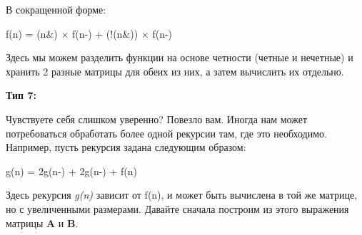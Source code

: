 \vspace{\baselineskip}
В сокращенной форме:

 \vspace{\baselineskip}
\begin{tcolorbox}
   f(n) = (n\&) $\times$ f(n-) + (!(n\&)) $\times$ f(n-)
\end{tcolorbox}

\vspace{\baselineskip}
Здесь мы можем разделить функции на основе четности (четные и нечетные) и хранить 2 разные матрицы для обеих из них, а затем вычислить их отдельно.

\vspace{\baselineskip}
\textbf{Тип 7:}

\vspace{\baselineskip}
Чувствуете себя слишком уверенно? Повезло вам. Иногда нам может потребоваться обработать более одной рекурсии там, где это необходимо. Например, пусть рекурсия задана следующим образом:

\vspace{\baselineskip}

\begin{tcolorbox}
   g(n) = 2g(n-) + 2g(n-) + f(n)            
\end{tcolorbox}

\vspace{\baselineskip}
Здесь рекурсия \textit{g(n)} зависит от f(n), и может быть вычислена в той же матрице, но с увеличенными размерами. Давайте сначала построим из этого выражения матрицы \textbf{A} и \textbf{B}.

